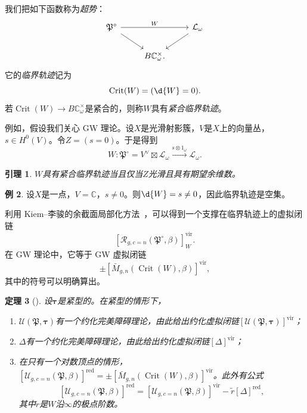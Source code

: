 \documentclass{amsart}
\newtheorem{thm}{定理}[section]
\newtheorem{lem}[thm]{引理}
\theoremstyle{definition}
\newtheorem{exm}[thm]{例}
\theoremstyle{remark}
\theoremstyle{plain}
\theoremstyle{definition}
\theoremstyle{remark}
\newcommand{\C}{\mathbb{C}}
\newcommand{\mc}[1]{\mathcal{#1}}
\newcommand{\mf}[1]{\mathfrak{#1}}
\newcommand{\mr}[1]{\mathrm{#1}}
\newcommand{\on}[1]{\operatorname{#1}}
\newcommand{\1}{\mathbf{1}}
\newcommand{\2}{\mathbf{2}}
\newcommand{\3}{\mathbf{3}}
\newcommand{\vir}{\mr{vir}}
\begin{document}
我们把如下函数称为\textit{超势}：
\begin{equation*}
\begin{tikzcd}
    \mf{P}^{\circ} \ar{rr}{W} \ar{dr} && \mc{L}_{\omega} \ar{dl} \\
    & B \C_{\omega}^{\times}.
\end{tikzcd}
\end{equation*}
它的\textit{临界轨迹}记为
\[ \on{Crit}(W) = (\d{W} = 0). \]
若\(\on{Crit}(W) \to B\C_{\omega}^{\times}\)是紧合的，则称\(W\)具有\textit{紧合临界轨迹}。

例如，假设我们关心 GW 理论。设\(X\)是光滑射影簇，\(V\)是\(X\)上的向量丛，\(s \in H^0(V)\)。令\(Z = (s = 0)\)。于是得到
\[ W \colon \mf{P}^{\circ} = V^{\vee} \boxtimes \mc{L}_{\omega} \xrightarrow{s \otimes 1_{\omega}} \mc{L}_{\omega}. \]

\begin{lem}
    \(W\)具有紧合临界轨迹当且仅当\(Z\)光滑且具有期望余维数。
\end{lem}

\begin{exm}
    设\(X\)是一点，\(V = \C\)，\(s \neq 0\)。则\(\d{W} = s \neq 0\)，因此临界轨迹是空集。
\end{exm}

利用 Kiem--李骏的余截面局部化方法~\cite{KiemLi2013}，可以得到一个支撑在临界轨迹上的虚拟闭链
\[ [\mc{R}_{g, c=n}(\mf{P}^{\circ}, \beta)]_W^{\vir}. \]
在 GW 理论中，它等于 GW 虚拟闭链
\[ \pm [\bar{M}_{g,n}(\on{Crit}(W), \beta)]^{\vir}, \]
其中的符号可以明确算出。

\begin{thm}[{\cite{CJR2021,CJW2021}}]
    设\(\bm{\tau}\)是紧型的。在紧型的情形下，
    \begin{enumerate}
        \item \(\mc{U}(\mf{P}, \bm{\tau})\)有一个约化完美障碍理论，由此给出约化虚拟闭链\([\mc{U}(\mf{P}, \bm{\tau})]^{\vir}\)；
        \item \(\Delta\)有一个约化完美障碍理论，由此给出约化虚拟闭链\([\Delta]^{\vir}\)；
        \item 在只有一个对数顶点的情形，\([\mc{U}_{g, c=n}(\mf{P}, \beta)]^{\on{red}} = \pm [\bar{M}_{g,n}(\on{Crit}(W), \beta)]^{\vir}\)。此外有公式
            \[ [\mc{U}_{g, c=n}(\mf{P}, \beta)]^{\on{red}} = [\mc{U}_{g, c=n}(\mf{P}, \beta)]^{\vir} - \tilde{r} [\Delta]^{\on{red}}, \]
            其中\(\tilde{r}\)是\(W\)沿\(\infty\)的极点阶数。
    \end{enumerate}
\end{thm}
\end{document}
